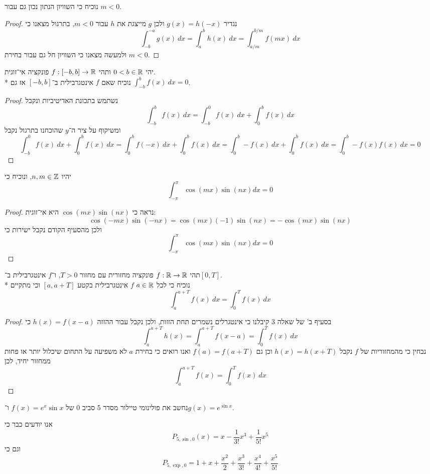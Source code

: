 \Subquestion{}
נוכיח כי השוויון הנתון נכון גם עבור $m < 0$.
\begin{proof}
	נגדיר $g(x) = h(-x)$ ולכן $g$ מייצגת את $h$ עבור $m < 0$, בתרגול מצאנו כי
	\[
		\int_{-b}^{-a} g(x)\ dx = \int_{a}^{b} h(x)\ dx = \int_{a/m}^{b/m} f(mx)\ dx
	\]
	ולמעשה מצאנו כי השוויון חל גם עבור בחירת $m < 0$.
\end{proof}

\Question{}
\Subquestion{}
יהי $0 < b \in \mathbb{R}$ ותהי $f : [-b, b] \to \mathbb{R}$ פונקציה אי־זוגית. \\*
נוכיח שאם $f$ אינטגרבילית ב־$[-b, b]$ אז גם $\int_{-b}^{b} f(x)\ dx = 0$.
\begin{proof}
	נשתמש בתכונת האדיטיביות ונקבל
	\[
		\int_{-b}^{b} f(x)\ dx
		= \int_{-b}^{0} f(x)\ dx + \int_{0}^{b} f(x)\ dx
	\]
	ומשיקוף על ציר ה־$y$ שהוכחנו בתרגול נקבל
	\[
		\int_{-b}^{0} f(x)\ dx + \int_{0}^{b} f(x)\ dx
		= \int_{0}^{b} f(-x)\ dx + \int_{0}^{b} f(x)\ dx
		= \int_{0}^{b} -f(x)\ dx + \int_{0}^{b} f(x)\ dx
		= \int_{0}^{b} -f(x) f(x)\ dx
		= 0
	\]
\end{proof}

\Subquestion{}
יהיו $n, m \in \mathbb{Z}$, ונוכיח כי
\[
	\int_{-\pi}^{\pi} \cos(mx) \sin(nx) dx = 0
\]
\begin{proof}
	נראה כי $\cos(mx) \sin(nx)$ היא אי־זוגית:
	\[
		\cos(-mx) \sin(-nx) = \cos(mx) (-1) \sin(nx) = -\cos(mx)\sin(nx)
	\]
	ולכן מהסעיף הקודם נקבל ישירות כי
	\[
		\int_{-\pi}^{\pi} \cos(mx) \sin(nx) dx = 0
	\]
\end{proof}

\Question{}
תהי $f : \mathbb{R} \to \mathbb{R}$ פונקציה מחזורית עם מחזור $T > 0$, ו־$f$ אינטגרבילית ב־$[0, T]$. \\*
נוכיח כי לכל $a \in \mathbb{R}$ $f$ אינטגרבילית בקטע $[a, a + T]$ וכי מתקיים
\[
	\int_{a}^{a + T} f(x)\ dx = \int_{0}^{T} f(x)\ dx
\]
\begin{proof}
	בסעיף ב' של שאלה 3 קיבלנו כי אינטגרלים נשמרים תחת הזזות, ולכן נקבל עבור ההזזה $h(x) = f(x - a)$ כי
	\[
		\int_{a}^{a + T} h(x) = \int_{a}^{a + T} f(x - a) = \int_{0}^{T} f(x)\ dx
	\]
	נבחין כי מהמחזוריות של $f$ נקבל $h(x) = h(x + T)$ וכן גם $f(a) = f(a + T)$ ואנו רואים כי בחירת $a$ לא משפיעה על התחום שיכלול יותר או פחות ממחזור יחיד, לכן
	\[
		\int_{a}^{a + T} f(x) = \int_{0}^{T} f(x)\ dx
	\]
\end{proof}

\Question{}
נחשב את פולינומי טיילור מסדר 5 סביב 0 של $f(x) = e^x \sin x$ ו־$g(x) = e^{\sin x}$.

אנו יודעים כבר כי
\[
	P_{5, \sin, 0}(x) = x - \frac{1}{3!} x^3 + \frac{1}{5!} x^5
\]
וגם כי
\[
	P_{5, \exp, 0} = 1 + x + \frac{x^2}{2} + \frac{x^3}{3!} + \frac{x^4}{4!} + \frac{x^5}{5!}
\]

